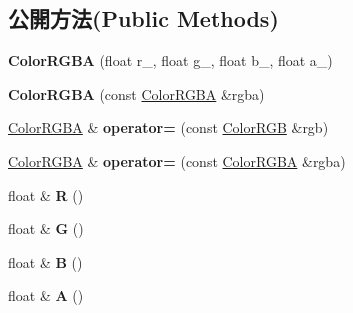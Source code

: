 \subsection*{公開方法(Public Methods)}
\begin{DoxyCompactItemize}
\item 
{\bfseries Color\+R\+G\+BA} (float r\+\_, float g\+\_, float b\+\_, float a\+\_)\hypertarget{class_magnum_1_1_color_r_g_b_a_a296f9c79c535b7221eddbcc1decaf15a}{}\label{class_magnum_1_1_color_r_g_b_a_a296f9c79c535b7221eddbcc1decaf15a}

\item 
{\bfseries Color\+R\+G\+BA} (const \hyperlink{class_magnum_1_1_color_r_g_b_a}{Color\+R\+G\+BA} \&rgba)\hypertarget{class_magnum_1_1_color_r_g_b_a_aae8dea40c9c169a5a9e8df856fdfc714}{}\label{class_magnum_1_1_color_r_g_b_a_aae8dea40c9c169a5a9e8df856fdfc714}

\item 
\hyperlink{class_magnum_1_1_color_r_g_b_a}{Color\+R\+G\+BA} \& {\bfseries operator=} (const \hyperlink{class_magnum_1_1_color_r_g_b}{Color\+R\+GB} \&rgb)\hypertarget{class_magnum_1_1_color_r_g_b_a_aac80b182c20e5e2b68d3495d078f1b3c}{}\label{class_magnum_1_1_color_r_g_b_a_aac80b182c20e5e2b68d3495d078f1b3c}

\item 
\hyperlink{class_magnum_1_1_color_r_g_b_a}{Color\+R\+G\+BA} \& {\bfseries operator=} (const \hyperlink{class_magnum_1_1_color_r_g_b_a}{Color\+R\+G\+BA} \&rgba)\hypertarget{class_magnum_1_1_color_r_g_b_a_a6842401a78acc9e6f34cbe0cb7dbe526}{}\label{class_magnum_1_1_color_r_g_b_a_a6842401a78acc9e6f34cbe0cb7dbe526}

\item 
float \& {\bfseries R} ()\hypertarget{class_magnum_1_1_color_r_g_b_a_a3af3e70734b4791a9bb92ac53a7caaa3}{}\label{class_magnum_1_1_color_r_g_b_a_a3af3e70734b4791a9bb92ac53a7caaa3}

\item 
float \& {\bfseries G} ()\hypertarget{class_magnum_1_1_color_r_g_b_a_a5f8118ad6bccb6bc09a3cf9afbe8b4ab}{}\label{class_magnum_1_1_color_r_g_b_a_a5f8118ad6bccb6bc09a3cf9afbe8b4ab}

\item 
float \& {\bfseries B} ()\hypertarget{class_magnum_1_1_color_r_g_b_a_ad85c8931cf2a8b60fe977554b23f0c3d}{}\label{class_magnum_1_1_color_r_g_b_a_ad85c8931cf2a8b60fe977554b23f0c3d}

\item 
float \& {\bfseries A} ()\hypertarget{class_magnum_1_1_color_r_g_b_a_a810d490f2be1c31d5fe3e83f61bf79cf}{}\label{class_magnum_1_1_color_r_g_b_a_a810d490f2be1c31d5fe3e83f61bf79cf}


\end{DoxyCompactItemize}
